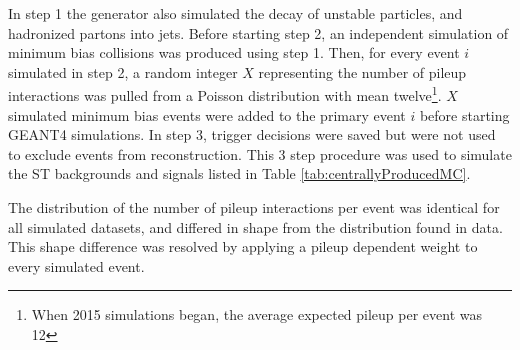 In step 1 the \MC generator also simulated the decay of unstable particles, and hadronized partons into jets.  
Before starting step 2, an independent \MC simulation of minimum bias collisions was produced using step 1.  
Then, for every event $i$ simulated in step 2, a random integer $X$ representing the number of pileup interactions 
was pulled from a Poisson distribution with mean twelve\footnote{When 2015 \MC simulations began, the average expected 
pileup per event was 12}.  $X$ simulated minimum bias events were added to the primary event $i$ before starting GEANT4 
simulations.  In step 3, trigger decisions were saved but were not used to exclude events from reconstruction.  This 
3 step procedure was used to simulate the ST backgrounds and \WR signals listed in Table \ref{tab:centrallyProducedMC}.

The distribution of the number of pileup interactions per event was identical for all simulated datasets, and 
differed in shape from the distribution found in data.  This shape difference was resolved by applying a pileup 
dependent weight to every simulated event.

